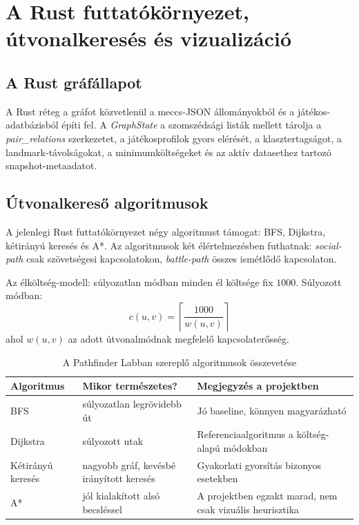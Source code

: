 \chapter{A Rust futtatókörnyezet, útvonalkeresés és vizualizáció}

\section{A Rust gráfállapot}

A Rust réteg a gráfot közvetlenül a meccs-JSON állományokból és a játékos-adatbázisból építi fel. A \textit{GraphState} a szomszédsági listák mellett tárolja a \textit{pair\_relations} szerkezetet, a játékosprofilok gyors elérését, a klasztertagságot, a landmark-távolságokat, a minimumköltségeket és az aktív datasethez tartozó snapshot-metaadatot.

\section{Útvonalkereső algoritmusok}

A jelenlegi Rust futtatókörnyezet négy algoritmust támogat: BFS, Dijkstra, kétirányú keresés és A*. Az algoritmusok két élértelmezésben futhatnak: \textit{social-path} csak szövetségesi kapcsolatokon, \textit{battle-path} összes ismétlődő kapcsolaton.

Az élköltség-modell: súlyozatlan módban minden él költsége fix $1000$. Súlyozott módban:
\begin{equation}
c(u,v)=\left\lceil \frac{1000}{w(u,v)} \right\rceil
\end{equation}
ahol $w(u,v)$ az adott útvonalmódnak megfelelő kapcsolaterősség.

\begin{table}[H]
\centering
\caption{A Pathfinder Labban szereplő algoritmusok összevetése}
\begin{tabularx}{\textwidth}{>{\raggedright\arraybackslash}p{2.8cm} >{\raggedright\arraybackslash}p{2.8cm} X}
\toprule
\textbf{Algoritmus} & \textbf{Mikor természetes?} & \textbf{Megjegyzés a projektben} \\
\midrule
BFS & súlyozatlan legrövidebb út & Jó baseline, könnyen magyarázható \\
Dijkstra & súlyozott utak & Referenciaalgoritmus a költség-alapú módokban \\
Kétirányú keresés & nagyobb gráf, kevésbé irányított keresés & Gyakorlati gyorsítás bizonyos esetekben \\
A* & jól kialakított alsó becsléssel & A projektben egzakt marad, nem csak vizuális heurisztika \\
\bottomrule
\end{tabularx}
\end{table}

